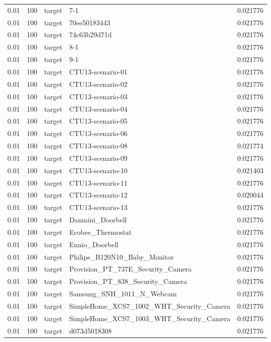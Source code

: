 \begin{tabular}{lllll}
0.01 & 100 & target & 7-1 & 0.021776 \\
0.01 & 100 & target & 70ee50183443 & 0.021776 \\
0.01 & 100 & target & 74c63b29d71d & 0.021776 \\
0.01 & 100 & target & 8-1 & 0.021776 \\
0.01 & 100 & target & 9-1 & 0.021776 \\
0.01 & 100 & target & CTU13-scenario-01 & 0.021776 \\
0.01 & 100 & target & CTU13-scenario-02 & 0.021776 \\
0.01 & 100 & target & CTU13-scenario-03 & 0.021776 \\
0.01 & 100 & target & CTU13-scenario-04 & 0.021776 \\
0.01 & 100 & target & CTU13-scenario-05 & 0.021776 \\
0.01 & 100 & target & CTU13-scenario-06 & 0.021776 \\
0.01 & 100 & target & CTU13-scenario-08 & 0.021774 \\
0.01 & 100 & target & CTU13-scenario-09 & 0.021776 \\
0.01 & 100 & target & CTU13-scenario-10 & 0.021403 \\
0.01 & 100 & target & CTU13-scenario-11 & 0.021776 \\
0.01 & 100 & target & CTU13-scenario-12 & 0.020044 \\
0.01 & 100 & target & CTU13-scenario-13 & 0.021776 \\
0.01 & 100 & target & Danmini\_Doorbell & 0.021776 \\
0.01 & 100 & target & Ecobee\_Thermostat & 0.021776 \\
0.01 & 100 & target & Ennio\_Doorbell & 0.021776 \\
0.01 & 100 & target & Philips\_B120N10\_Baby\_Monitor & 0.021776 \\
0.01 & 100 & target & Provision\_PT\_737E\_Security\_Camera & 0.021776 \\
0.01 & 100 & target & Provision\_PT\_838\_Security\_Camera & 0.021776 \\
0.01 & 100 & target & Samsung\_SNH\_1011\_N\_Webcam & 0.021776 \\
0.01 & 100 & target & SimpleHome\_XCS7\_1002\_WHT\_Security\_Camera & 0.021776 \\
0.01 & 100 & target & SimpleHome\_XCS7\_1003\_WHT\_Security\_Camera & 0.021776 \\
0.01 & 100 & target & d073d5018308 & 0.021776 \\

\end{tabular}
